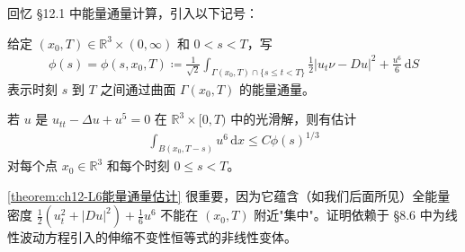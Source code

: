 \documentclass[../../main.tex]{subfiles}
\begin{document}
回忆 \S12.1 中能量通量计算，引入以下记号：

\begin{definition}\label{notation:ch12-能量通量}
给定 $(x_0,T)\in\mathbb{R}^3\times(0,\infty)$ 和 $0<s<T$，写
\begin{align*}
\phi(s)=\phi(s,x_0,T)\coloneqq\frac{1}{\sqrt{2}}\int_{\Gamma(x_0,T)\cap\{s\leqslant t<T\}}\frac{1}{2}|u_t\nu-Du|^2+\frac{u^6}{6}\,\mathrm{d}S
\end{align*}
表示时刻 $s$ 到 $T$ 之间通过曲面 $\Gamma(x_0,T)$ 的能量通量。
\end{definition}

\begin{theorem}[$L^6$-能量通量估计。]\label{theorem:ch12-L6能量通量估计}若 $u$ 是 $u_{tt}-\Delta u+u^5=0$ 在 $\mathbb{R}^3\times[0,T)$ 中的光滑解，则有估计
\begin{align}
\int_{B(x_0,T-s)}u^6\,\mathrm{d}x\leqslant C\phi(s)^{1/3}
\label{align:ch12-L6通量}
\end{align}
对每个点 $x_0\in\mathbb{R}^3$ 和每个时刻 $0\leqslant s<T$。
\end{theorem}

\cref{theorem:ch12-L6能量通量估计} 很重要，因为它蕴含（如我们后面所见）全能量密度 $\frac{1}{2}(u_t^2+|Du|^2)+\frac{1}{6}u^6$ 不能在 $(x_0,T)$ 附近"集中"。证明依赖于 \S8.6 中为线性波动方程引入的伸缩不变性恒等式的非线性变体。
\end{document}
